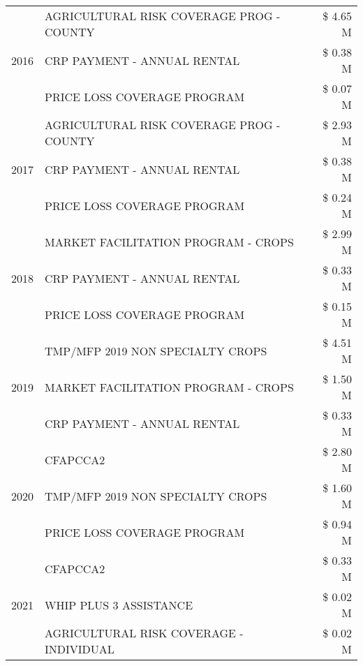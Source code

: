 \begin{tabular}{llr}
\cline{1-3}
\multirow[t]{3}{*}{2016} & AGRICULTURAL RISK COVERAGE PROG - COUNTY      & \$ 4.65 M \\
 & CRP PAYMENT - ANNUAL RENTAL                   & \$ 0.38 M \\
 & PRICE LOSS COVERAGE PROGRAM                   & \$ 0.07 M \\
\cline{1-3}
\multirow[t]{3}{*}{2017} & AGRICULTURAL RISK COVERAGE PROG - COUNTY & \$ 2.93 M \\
 & CRP PAYMENT - ANNUAL RENTAL & \$ 0.38 M \\
 & PRICE LOSS COVERAGE PROGRAM & \$ 0.24 M \\
\cline{1-3}
\multirow[t]{3}{*}{2018} & MARKET FACILITATION PROGRAM - CROPS & \$ 2.99 M \\
 & CRP PAYMENT - ANNUAL RENTAL & \$ 0.33 M \\
 & PRICE LOSS COVERAGE PROGRAM & \$ 0.15 M \\
\cline{1-3}
\multirow[t]{3}{*}{2019} & TMP/MFP 2019 NON SPECIALTY CROPS & \$ 4.51 M \\
 & MARKET FACILITATION PROGRAM - CROPS & \$ 1.50 M \\
 & CRP PAYMENT - ANNUAL RENTAL & \$ 0.33 M \\
\cline{1-3}
\multirow[t]{3}{*}{2020} & CFAPCCA2 & \$ 2.80 M \\
 & TMP/MFP 2019 NON SPECIALTY CROPS & \$ 1.60 M \\
 & PRICE LOSS COVERAGE PROGRAM & \$ 0.94 M \\
\cline{1-3}
\multirow[t]{3}{*}{2021} & CFAPCCA2 & \$ 0.33 M \\
 & WHIP PLUS 3 ASSISTANCE & \$ 0.02 M \\
 & AGRICULTURAL RISK COVERAGE - INDIVIDUAL & \$ 0.02 M \\
\cline{1-3}
\bottomrule
\end{tabular}
